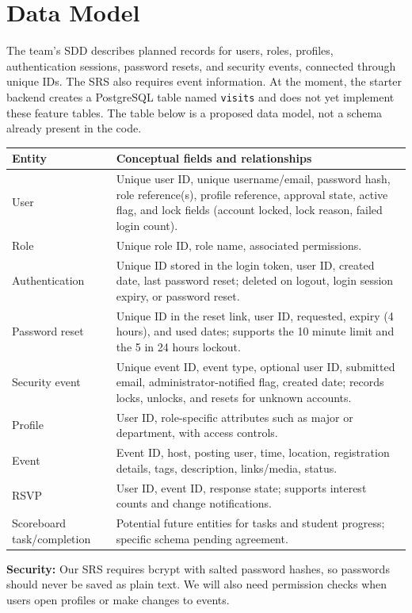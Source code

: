 \newpage %
\section{Data Model}
The team's SDD describes planned records for users, roles, profiles, authentication sessions, password resets, and security events, connected through unique IDs. The SRS also requires event information. At the moment, the starter backend creates a PostgreSQL table named \texttt{visits} and does not yet implement these feature tables. The table below is a proposed data model, not a schema already present in the code.
\begin{longtable}{L{0.25\textwidth}L{0.65\textwidth}}
\toprule Entity & Conceptual fields and relationships \\ \midrule
User & Unique user ID, unique username/email, password hash, role reference(s), profile reference, approval state, active flag, and lock fields (account locked, lock reason, failed login count).\\
Role & Unique role ID, role name, associated permissions.\\
Authentication & Unique ID stored in the login token, user ID, created date, last password reset; deleted on logout, login session expiry, or password reset.\\
Password reset & Unique ID in the reset link, user ID, requested, expiry (4 hours), and used dates; supports the 10 minute limit and the 5 in 24 hours lockout.\\
Security event & Unique event ID, event type, optional user ID, submitted email, administrator-notified flag, created date; records locks, unlocks, and resets for unknown accounts.\\
Profile & User ID, role-specific attributes such as major or department, with access controls.\\
Event & Event ID, host, posting user, time, location, registration details, tags, description, links/media, status.\\
RSVP & User ID, event ID, response state; supports interest counts and change notifications.\\
Scoreboard task/completion & Potential future entities for tasks and student progress; specific schema pending agreement.\\
\bottomrule
\end{longtable}
\noindent\textbf{Security:} Our SRS requires bcrypt with salted password hashes, so passwords should never be saved as plain text. We will also need permission checks when users open profiles or make changes to events.

